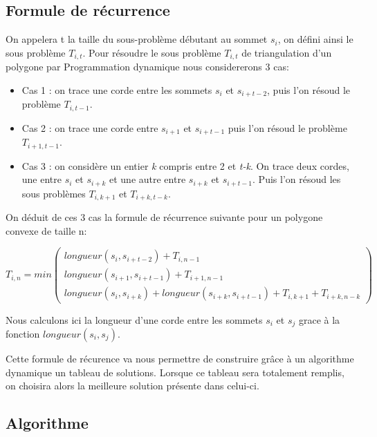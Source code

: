 \documentclass[a4paper,10pt]{article}
\begin{document}
\subsection{Formule de récurrence}



On appelera t la taille du sous-problème débutant au sommet \(s_i\), on défini ainsi le sous problème \(T_{i,t}\).
Pour résoudre le sous problème \(T_{i,t}\) de triangulation d'un polygone par Programmation dynamique nous considererons 3 cas:

\begin{itemize}
 \item Cas 1 : on trace une corde entre les sommets \(s_i\) et \(s_{i+t-2}\), puis l'on résoud le problème \(T_{i,t-1}\).
 \item Cas 2 : on trace une corde entre \(s_{i+1}\) et \(s_{i+t-1}\) puis l'on résoud le problème \(T_{i+1,t-1}\).
 \item Cas 3 : on considère un entier \emph{k} compris entre 2 et \emph{t-k}. On trace deux cordes, une entre \(s_{i}\) et \(s_{i+k}\) et une autre entre \(s_{i+k}\) et \(s_{i+t-1}\).
 Puis l'on résoud les sous problèmes \(T_{i,k+1}\) et \(T_{i+k,t-k}\).
\end{itemize}

On déduit de ces 3 cas la formule de récurrence suivante pour un polygone convexe de taille n: 

\begin{equation} 
T_{i,n} = min 
\begin{pmatrix} 
 longueur(s_i, s_{i+t-2}) + T_{i,n-1} \\
  longueur(s_{i+1}, s_{i+t-1}) + T_{i+1,n-1} \\
  longueur(s_i, s_{i+k}) + longueur(s_{i+k}, s_{i+t-1}) + T_{i,k+1} + T_{i+k,n-k}
\end{pmatrix}               
\end{equation}

Nous calculons ici la longueur d'une corde entre les sommets \(s_i\) et \(s_j\) grace à la fonction \( longueur(s_i, s_j) \). 

Cette formule de récurence va nous permettre de construire grâce à un algorithme dynamique un tableau de solutions.
Lorsque ce tableau sera totalement remplis, on choisira alors la meilleure solution présente dans celui-ci.

\subsection{Algorithme}
\end{document}
